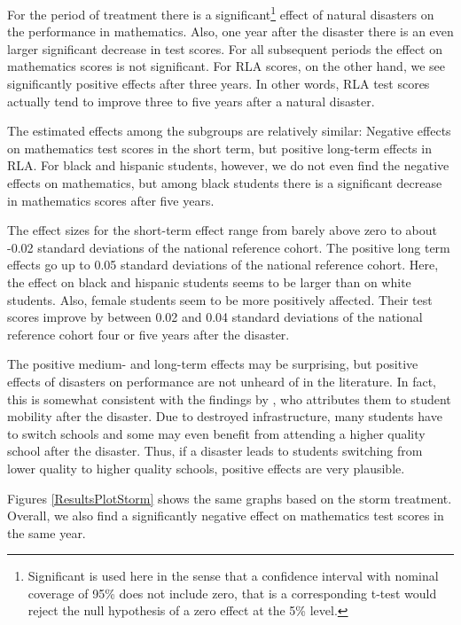 For the period of treatment there is a significant\footnote{Significant is used here in the sense that a confidence interval with nominal coverage of 95\% does not include zero, that is a corresponding t-test would reject the null hypothesis of a zero effect at the 5\% level.} effect of natural disasters on the performance in mathematics. Also, one year after the disaster there is an even larger significant decrease in test scores. For all subsequent periods the effect on mathematics scores is not significant. For RLA scores, on the other hand, we see significantly positive effects after three years. In other words, RLA test scores actually tend to improve three to five years after a natural disaster.

The estimated effects among the subgroups are relatively similar: Negative effects on mathematics test scores in the short term, but positive long-term effects in RLA. For black and hispanic students, however, we do not even find the negative effects on mathematics, but among black students there is a significant decrease in mathematics scores after five years.

The effect sizes for the short-term effect range from barely above zero to about -0.02 standard deviations of the national reference cohort. The positive long term effects go up to 0.05 standard deviations of the national reference cohort. Here, the effect on black and hispanic students seems to be larger than on white students. Also, female students seem to be more positively affected. Their test scores improve by between 0.02 and 0.04 standard deviations of the national reference cohort four or five years after the disaster.

The positive medium- and long-term effects may be surprising, but positive effects of disasters on performance are not unheard of in the literature. In fact, this is somewhat consistent with the findings by \cite{Sacerdote_2012}, who attributes them to student mobility after the disaster. Due to destroyed infrastructure, many students have to switch schools and some may even benefit from attending a higher quality school after the disaster. Thus, if a disaster leads to students switching from lower quality to higher quality schools, positive effects are very plausible.

Figures \ref{ResultsPlotStorm} shows the same graphs based on the storm treatment. Overall, we also find a significantly negative effect on mathematics test scores in the same year.

